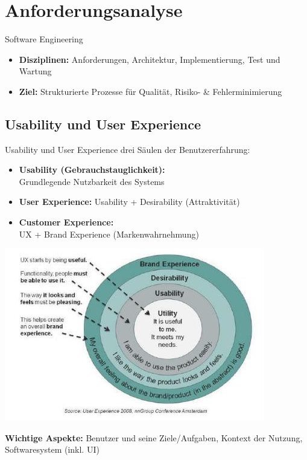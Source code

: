 \section{Anforderungsanalyse}

\begin{definition}{Software Engineering}
\begin{itemize}
    \item \textbf{Disziplinen:} 
    Anforderungen, Architektur, Implementierung, Test und Wartung
    \item \textbf{Ziel:} 
    Strukturierte Prozesse für Qualität, Risiko- \& Fehlerminimierung
\end{itemize}
\end{definition} 

\subsection{Usability und User Experience}

\begin{concept}{Usability und User Experience} drei Säulen der Benutzererfahrung:
    \begin{itemize}
        \item \textbf{Usability (Gebrauchstauglichkeit):} \\ Grundlegende Nutzbarkeit des Systems
        \item \textbf{User Experience:} Usability + Desirability (Attraktivität)
        \item \textbf{Customer Experience:} \\ UX + Brand Experience (Markenwahrnehmung)
    \end{itemize}
    \includegraphics[width=0.6\linewidth]{images/2024_12_29_0d1d7b5551ea1b4b41bdg-02}
    
    \textbf{Wichtige Aspekte:}
    Benutzer und seine Ziele/Aufgaben, Kontext der Nutzung, Softwaresystem (inkl. UI)
\end{concept}

